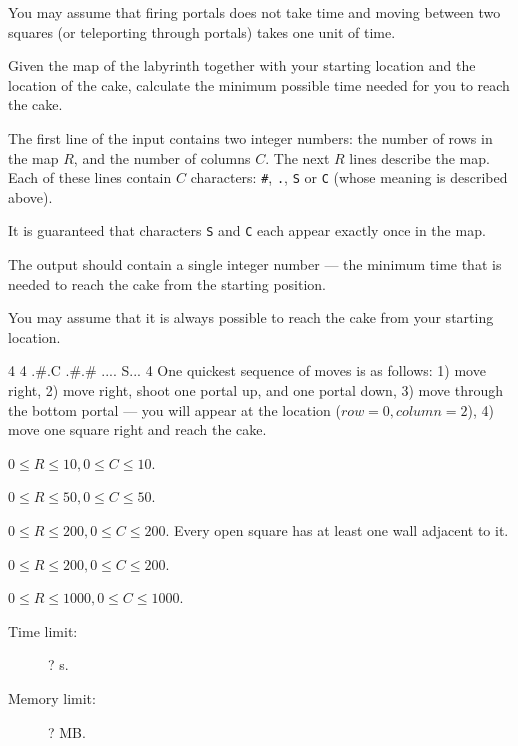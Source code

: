 \documentclass{boi2014}
\newcommand{\constant}[1]{{\tt #1}}
\begin{document}
    You may assume that firing portals does not take time and moving
    between two squares (or teleporting through portals) takes one unit
    of time.

    \Task
    Given the map of the labyrinth together with your starting location
    and the location of the cake, calculate the minimum possible time needed
    for you to reach the cake.

    \Input
    The first line of the input contains two integer numbers: the number of rows
    in the map $R$, and the number of columns $C$. The next $R$ lines describe
    the map. Each of these lines contain $C$ characters: \constant{\#},
    \constant{.}, \constant{S} or \constant{C} (whose meaning is described
    above).

    It is guaranteed that characters \constant{S} and \constant{C} each appear
    exactly once in the map.

    \Output
    The output should contain a single integer number --- the minimum time that
    is needed to reach the cake from the starting position.

    You may assume that it is always possible to reach the cake from your
    starting location.

    \Example
    \example
    {
        4 4\newline
        .\#.C\newline
        .\#.\#\newline
        ....\newline
        S...
    }
    {
        4
    }
    {
        One quickest sequence of moves is as follows: 1) move right, 2) move
        right, shoot one portal up, and one portal down, 3) move through the
        bottom portal --- you will appear at the location ($row = 0,
        column = 2$), 4) move one square right and reach the cake.
    }

    \Scoring

    \begin{description}[leftmargin=0pt]
        \item[Subtask 1 (? points):] $0 \le R \le 10, 0 \le C \le 10$.
        \item[Subtask 2 (? points):] $0 \le R \le 50, 0 \le C \le 50$.
        \item[Subtask 3 (? points):] $0 \le R \le 200, 0 \le C \le 200$.
        Every open square has at least one wall adjacent to it.
        \item[Subtask 4 (? points):] $0 \le R \le 200, 0 \le C \le 200$.
        \item[Subtask 5 (? points):] $0 \le R \le 1000, 0 \le C \le 1000$.
    \end{description}

    \Constraints

    \begin{description}
        \item[Time limit:] ? s.
        \item[Memory limit:] ? MB.
    \end{description}
\end{document}
